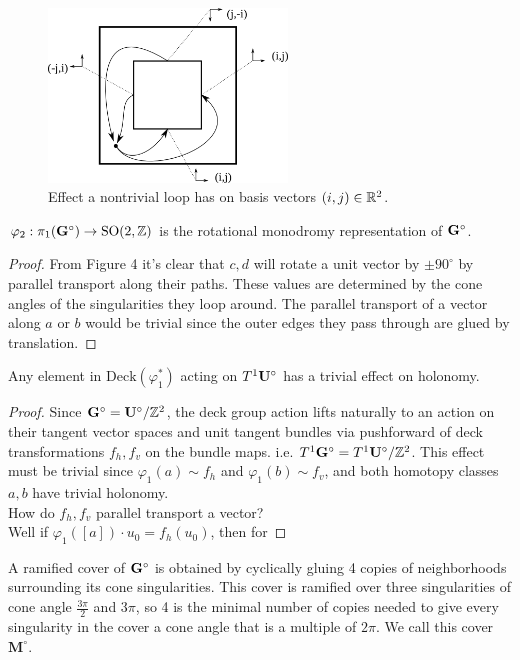 \documentclass[]{article}
\def\bMs{\mathbf{M}^\circ}
\begin{document}
\begin{figure}[H]
\centering
\includegraphics[width=2.5in]{monodromy.png}
\caption{Effect a nontrivial loop has on basis vectors $(i,j)\in\mathbb{R}^2$.}
\label{fig:loop}
\end{figure}

\begin{thm}
$\varphi_2:\pi_1(\mathbf{G}^\circ)\rightarrow \mathrm{SO}(2,\mathbb{Z})$ is the rotational monodromy representation of $\mathbf{G}^\circ$.
\begin{proof}
From Figure 4 it's clear that $c,d$ will rotate a unit vector by $\pm 90^\circ$ by parallel transport along their paths. These values are determined by the cone angles of the singularities they loop around. The parallel transport of a vector along $a$ or $b$ would be trivial since the outer edges they pass through are glued by translation.
\end{proof}
\end{thm}


\begin{lem}
Any element in $\text{Deck}(\varphi_1^*)$ acting on $T^1\mathbf{U}^\circ$ has a trivial effect on holonomy.
\begin{proof}
Since $\mathbf{G}^\circ=\mathbf{U}^\circ/\mathbb{Z}^2$, the deck group action lifts naturally to an action on their tangent vector spaces and unit tangent bundles via pushforward of deck transformations $f_h,f_v$ on the bundle maps. i.e. $T^1\mathbf{G}^\circ=T^1\mathbf{U}^\circ/\mathbb{Z}^2$. This effect must be trivial since $\varphi_1(a)\sim f_h$ and $\varphi_1(b)\sim f_v$, and both homotopy classes $a,b$ have trivial holonomy.  \\
How do $f_h,f_v$ parallel transport a vector?\\
Well if $\varphi_1([a])\cdot u_0=f_h(u_0)$, then for 
\end{proof}
\end{lem}

A ramified cover of $\mathbf{G}^\circ$ is obtained by cyclically gluing 4 copies of neighborhoods surrounding its cone singularities. This cover is ramified over three singularities of cone angle $\frac{3\pi}{2}$ and $3\pi$, so 4 is the minimal number of copies needed to give every singularity in the cover a cone angle that is a multiple of $2\pi$. We call this cover $\bMs$.
\end{document}
